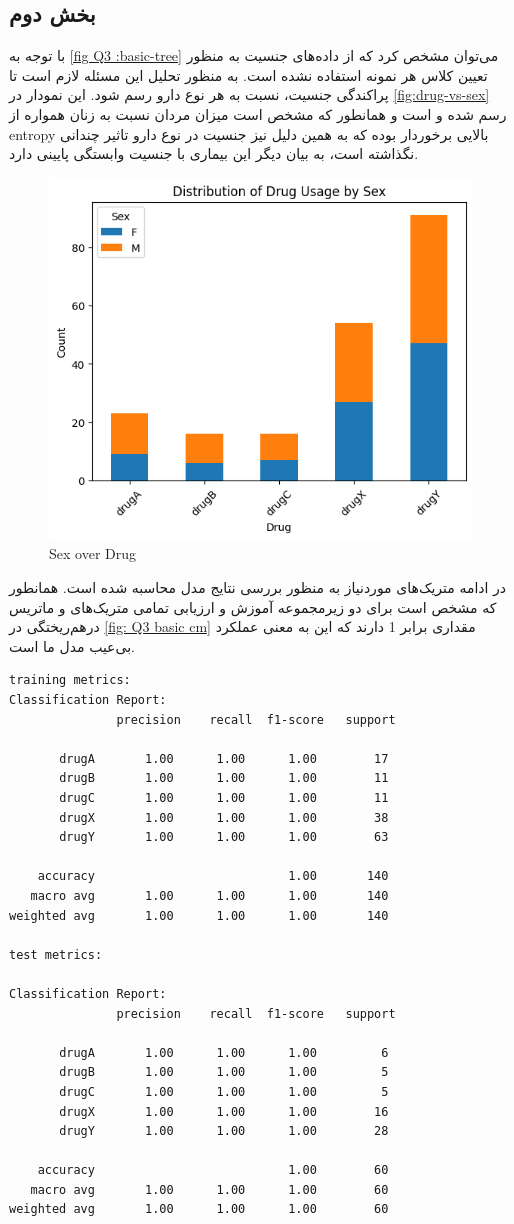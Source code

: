 \documentclass{article}
\begin{document}
\subsection{بخش دوم}
با توجه به 
‎\autoref{fig Q3 :basic-tree}
 می‌توان مشخص کرد که از داده‌های جنسیت به منظور تعیین کلاس هر نمونه استفاده نشده است. به منظور تحلیل این مسئله لازم است تا پراکندگی جنسیت، نسبت به هر نوع دارو رسم شود. این نمودار در 
\autoref{fig:drug-vs-sex}
 رسم شده و است و همانطور که مشخص است میزان مردان نسبت به زنان همواره از 
 entropy
 بالایی برخوردار بوده که به همین دلیل نیز جنسیت در نوع دارو تاثیر چندانی نگذاشته است، به بیان دیگر این بیماری با جنسیت وابستگی پایینی دارد.
 
 
\begin{figure}[H]
\centering
\includegraphics[width=0.5\linewidth]{"img/Q3/drug vs sex"}
\caption{Sex over Drug}
\label{fig:drug-vs-sex}
\end{figure}

در ادامه متریک‌‌های موردنیاز به منظور بررسی نتایج مدل محاسبه شده است. همانطور که مشخص است برای دو زیرمجموعه آموزش و ارزیابی تمامی متریک‌های و ماتریس درهم‌ریختگی در 
\autoref{fig: Q3 basic cm}
مقداری برابر 1 دارند که این به معنی عملکرد بی‌عیب مدل ما است.
\begin{LTR}
\begin{verbatim}
training metrics:
Classification Report:
               precision    recall  f1-score   support

       drugA       1.00      1.00      1.00        17
       drugB       1.00      1.00      1.00        11
       drugC       1.00      1.00      1.00        11
       drugX       1.00      1.00      1.00        38
       drugY       1.00      1.00      1.00        63

    accuracy                           1.00       140
   macro avg       1.00      1.00      1.00       140
weighted avg       1.00      1.00      1.00       140

test metrics:

Classification Report:
               precision    recall  f1-score   support

       drugA       1.00      1.00      1.00         6
       drugB       1.00      1.00      1.00         5
       drugC       1.00      1.00      1.00         5
       drugX       1.00      1.00      1.00        16
       drugY       1.00      1.00      1.00        28

    accuracy                           1.00        60
   macro avg       1.00      1.00      1.00        60
weighted avg       1.00      1.00      1.00        60
\end{verbatim}
\end{LTR}
\end{document}
